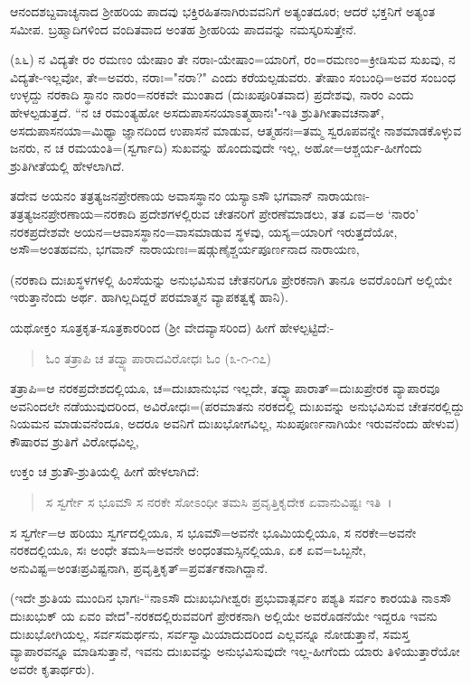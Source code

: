 
ಆನಂದಶಬ್ದವಾಚ್ಯನಾದ ಶ‍್ರೀಹರಿಯ ಪಾದವು ಭಕ್ತಿರಹಿತನಾಗಿರುವವನಿಗೆ ಅತ್ಯಂತದೂರ; ಆದರೆ ಭಕ್ತನಿಗೆ ಅತ್ಯಂತ ಸಮೀಪ. ಬ್ರಹ್ಮಾದಿಗಳಿಂದ ವಂದಿತವಾದ ಅಂತಹ ಶ‍್ರೀಹರಿಯ ಪಾದವನ್ನು ನಮಸ್ಕರಿಸುತ್ತೇನೆ.

(೩೬) ನ ವಿದ್ಯತೇ ರಂ ರಮಣಂ ಯೇಷಾಂ ತೇ ನರಾಃ-ಯೇಷಾಂ=ಯಾರಿಗೆ, ರಂ=ರಮಣಂ=ಕ್ರೀಡಿಸುವ ಸುಖವು, ನ ವಿದ್ಯತೇ-ಇಲ್ಲವೋ, ತೇ=ಅವರು, ನರಾಃ="ನರಾ?" ಎಂದು ಕರೆಯಲ್ಪಡುವರು. ತೇಷಾಂ ಸಂಬಂಧಿ=ಅವರ ಸಂಬಂಧ ಉಳ್ಳದ್ದು ನರಕಾದಿ ಸ್ಥಾನಂ ನಾರಂ=ನರಕವೇ ಮುಂತಾದ (ದುಃಖಪೂರಿತವಾದ) ಪ್ರದೇಶವು, ನಾರಂ ಎಂದು ಹೇಳಲ್ಪಡುತ್ತದೆ. ``ನ ಚ ರಮಂತ್ಯಹೋ ಅಸದುಪಾಸನಯಾಽತ್ಮಹಾನಃ"-ಇತಿ ಶ್ರುತಿಗೀತಾವಚನಾತ್, ಅಸದುಪಾಸನಯಾ=ಮಿಥ್ಯಾ ಜ್ಞಾನದಿಂದ ಉಪಾಸನೆ ಮಾಡುವ, ಆತ್ಮಹನಃ=ತಮ್ಮ ಸ್ವರೂಪವನ್ನೇ ನಾಶಮಾಡಕೊಳ್ಳುವ ಜನರು, ನ ಚ ರಮಯಂತಿ=(ಸ್ವರ್ಗಾದಿ) ಸುಖವನ್ನು ಹೊಂದುವುದೇ ಇಲ್ಲ, ಅಹೋ=ಆಶ್ಚರ್ಯ-ಹೀಗೆಂದು ಶ್ರುತಿಗೀತೆಯಲ್ಲಿ ಹೇಳಲಾಗಿದೆ.

ತದೇವ ಅಯನಂ ತತ್ರತ್ಯಜನಪ್ರೇರಣಾಯ ಅವಾಸಸ್ಥಾನಂ ಯಸ್ಯಾಽಸೌ ಭಗವಾನ್ ನಾರಾಯಣಃ-ತತ್ರತ್ಯಜನಪ್ರೇರಣಾಯ=ನರಕಾದಿ ಪ್ರದೇಶಗಳಲ್ಲಿರುವ ಚೇತನರಿಗೆ ಪ್ರೇರಣೆಮಾಡಲು, ತತ ಏವ=ಅ `ನಾರಂ' ನರಕಪ್ರದೇಶವೇ ಅಯನ=ಆವಾಸಸ್ಥಾನಂ=ವಾಸಮಾಡುವ ಸ್ಥಳವು, ಯಸ್ಯ=ಯಾರಿಗೆ ಇರುತ್ತದೆಯೋ, ಅಸೌ=ಅಂತಹವನು, ಭಗವಾನ್ ನಾರಾಯಣಃ=ಷಡ್ಗುಣೈಶ್ಚರ್ಯಪೂರ್ಣನಾದ ನಾರಾಯಣ,

(ನರಕಾದಿ ದುಃಖಸ್ಥಳಗಳಲ್ಲಿ ಹಿಂಸೆಯನ್ನು ಅನುಭವಿಸುವ ಚೇತನರಿಗೂ ಪ್ರೇರಕನಾಗಿ ತಾನೂ ಅವರೊಂದಿಗೆ ಅಲ್ಲಿಯೇ ಇರುತ್ತಾನೆಂದು ಅರ್ಥ. ಹಾಗಿಲ್ಲದಿದ್ದರೆ ಪರಮಾತ್ಮನ ವ್ಯಾಪಕತ್ವಕ್ಕೆ ಹಾನಿ).

ಯಥೋಕ್ತಂ ಸೂತ್ರಕೃತ-ಸೂತ್ರಕಾರರಿಂದ (ಶ‍್ರೀ ವೇದವ್ಯಾಸರಿಂದ) ಹೀಗೆ ಹೇಳಲ್ಪಟ್ಟಿದೆ:-

\begin{verse}
ಓಂ ತತ್ರಾಪಿ ಚ ತದ್ವ್ಯಾಪಾರಾದವಿರೋಧಃ ಓಂ (೩-೧-೧೭)
\end{verse}

ತತ್ರಾಪಿ=ಆ ನರಕಪ್ರದೇಶದಲ್ಲಿಯೂ, ಚ=ದುಃಖಾನುಭವ ಇಲ್ಲದೇ, ತದ್ವ್ಯಾಪಾರಾತ್=ದುಃಖಪ್ರೇರಕ ವ್ಯಾಪಾರವೂ ಅವನಿಂದಲೇ ನಡೆಯುವುದರಿಂದ, ಅವಿರೋಧಃ=(ಪರಮಾತನು ನರಕದಲ್ಲಿ ದುಃಖವನ್ನು ಅನುಭವಿಸುವ ಚೇತನರಲ್ಲಿದ್ದು ನಿಯಮನ ಮಾಡುವನೆಂದೂ, ಅದರೂ ಅವನಿಗೆ ದುಃಖಭೋಗವಿಲ್ಲ, ಸುಖಪೂರ್ಣನಾಗಿಯೇ ಇರುವನೆಂದು ಹೇಳುವ) ಕೌಷಾರವ ಶ್ರುತಿಗೆ ವಿರೋಧವಿಲ್ಲ,

ಉಕ್ತಂ ಚ ಶ್ರುತೌ-ಶ್ರುತಿಯಲ್ಲಿ ಹೀಗೆ ಹೇಳಲಾಗಿದೆ:

\begin{verse}
ಸ ಸ್ವರ್ಗೇ ಸ ಭೂಮೌ ಸ ನರಕೇ ಸೋಽಂಧೀ ತಮಸಿ ಪ್ರವೃತ್ತಿಕೃದೇಕ ಏವಾನುವಿಷ್ಟಃ ಇತಿ~।
\end{verse}


ಸ ಸ್ವರ್ಗೇ=ಆ ಹರಿಯು ಸ್ವರ್ಗದಲ್ಲಿಯೂ, ಸ ಭೂಮೌ=ಅವನೇ ಭೂಮಿಯಲ್ಲಿಯೂ, ಸ ನರಕೇ=ಅವನೇ ನರಕದಲ್ಲಿಯೂ, ಸಃ ಅಂಧೇ ತಮಸಿ=ಅವನೇ ಅಂಧಂತಮಸ್ಸಿನಲ್ಲಿಯೂ, ಏಕ ಏವ=ಒಬ್ಬನೇ, ಅನುವಿಷ್ಟ=ಅಂತಃಪ್ರವಿಷ್ಟನಾಗಿ, ಪ್ರವೃತ್ತಿಕೃತ್=ಪ್ರವರ್ತಕನಾಗಿದ್ದಾನೆ.

(ಇದೇ ಶ್ರುತಿಯ ಮುಂದಿನ ಭಾಗಃ-``ನಾಽಸೌ ದುಃಖಭುಗೀಶ್ವರಃ ಪ್ರಭುವಾತ್ಸರ್ವಂ ಪಶ್ಯತಿ ಸರ್ವಂ ಕಾರಯತಿ ನಾಽಸೌ ದುಃಖಭುಕ್ ಯ ಏವಂ ವೇದ"-ನರಕದಲ್ಲಿರುವವರಿಗೆ ಪ್ರೇರಕನಾಗಿ ಅಲ್ಲಿಯೇ ಅವರೊಡನೆಯೇ ಇದ್ದರೂ ಇವನು ದುಃಖಭೋಗಿಯಲ್ಲ, ಸರ್ವಸಮರ್ಥನು, ಸರ್ವಸ್ವಾಮಿಯಾದುದರಿಂದ ಎಲ್ಲವನ್ನೂ ನೋಡುತ್ತಾನೆ, ಸಮಸ್ತ ವ್ಯಾಪಾರವನ್ನೂ ಮಾಡಿಸುತ್ತಾನೆ, ಇವನು ದುಃಖವನ್ನು ಅನುಭವಿಸುವುದೇ ಇಲ್ಲ-ಹೀಗೆಂದು ಯಾರು ತಿಳಿಯುತ್ತಾರೆಯೋ ಅವರೇ ಕೃತಾರ್ಥರು).


